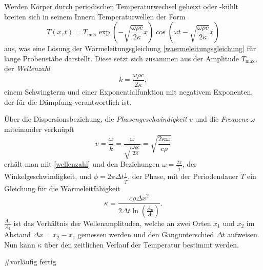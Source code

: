 Werden Körper durch periodischen Temperaturwechsel geheizt oder -kühlt breiten sich in seinem Innern Temperaturwellen der Form
\begin{equation}
	\label{temperaturwelle}
	T(x,t)= T_\mathup{max} \exp{\left(-\sqrt{\frac{\omega \rho c}{2\kappa}}x\right)} \cos{\left(\omega t - \sqrt{\frac{\omega \rho c}{2\kappa}}x\right)}
\end{equation}
aus, was eine Lösung der Wärmeleitungsgleichung \eqref{waermeleitungsgleichung} für lange Probenstäbe darstellt. Diese setzt sich zusammen aus der Amplitude $T_\text{max}$, der \emph{Wellenzahl} 
\begin{equation}
	\label{wellenzahl}
	k=\frac{\omega \rho c}{2\kappa} ,
\end{equation}
einem Schwingterm und einer Exponentialfunktion mit negativem Exponenten, der für die Dämpfung verantwortlich ist.

Über die Dispersionsbeziehung, die \emph{Phasengeschwindigkeit} $v$ und die \emph{Frequenz} $\omega$ miteinander verknüpft
\begin{equation}
	\label{dispersion}
	v=\frac{\omega}{k}=\frac{\omega}{\sqrt{\frac{\omega\rho c}{2\kappa}}}=\sqrt{\frac{2\kappa\omega}{c\rho}}
\end{equation}
erhält man mit \eqref{wellenzahl} und den Beziehungen $\omega=\frac{2\pi}{\tilde{T}}$, der Winkelgeschwindigkeit, und $\phi=2\pi\Delta{t}\frac{1}{\tilde{T}}$, der Phase, mit der Periodendauer $\tilde{T}$ ein Gleichung für die Wärmeleitfähigkeit
\begin{equation}
	\label{waermeleitfaehigkeit}
	\kappa=\frac{c\rho{\Delta{x}}^2}{2\Delta{t}\ln\left({\frac{A_\text{n}}{A_\text{f}}}\right)}.
\end{equation}
$\frac{A_\text{n}}{A_\text{f}}$ ist das Verhältnis der Wellenamplituden, welche an zwei Orten $x_1$ und $x_2$ im Abstand
$\Delta{x}=x_2-x_1$ gemessen werden und den Gangunterschied $\Delta{t}$ aufweisen. Nun kann $\kappa$ über den zeitlichen Verlauf der Temperatur bestimmt werden.

#vorläufig fertig

